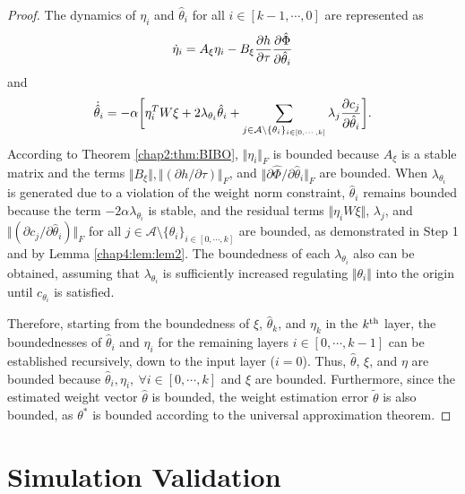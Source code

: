\begin{proof}
The dynamics of $\eta_i$ and $\hat\theta_i$ for all $i\in [k-1,\cdots,0]$ are represented as
\begin{equation}
    \dot\eta_i = 
    A_\xi\eta_i -B_\xi {\partial h\over\partial\tau}
    {\partial \hat\Phi\over \partial \hat\theta_i}
\end{equation}
and
\begin{equation}
    \dot{\hat\theta}_i 
    =
    -\alpha 
    \bigg[
        \eta_i^TW\xi+2\lambda_{\theta_i} \hat\theta_i
        +
        \sum_{j\in\mathcal{A}\setminus \{\theta_i\}_{i\in[0,\cdots,k]}}\lambda_j{\partial c_j\over\partial \hat\theta_i}
    \bigg]
    .
\end{equation}
According to Theorem \ref{chap2:thm:BIBO}, $\Vert\eta_i\Vert_F$ is bounded because $A_\xi$ is a stable matrix and the terms $\Vert B_\xi\Vert, \Vert(\partial h/\partial \tau)\Vert_F$, and $\Vert\partial \hat\Phi/\partial\hat\theta_i\Vert_F$ are bounded.
When $\lambda_{\theta_i}$ is generated due to a violation of the weight norm constraint, $\hat\theta_i$ remains bounded because the term $-2\alpha\lambda_{\theta_i}$ is stable, and the residual terms $\Vert\eta_iW\xi\Vert$, $\lambda_j$, and $\Vert(\partial c_j/\partial \hat\theta_i)\Vert_F$ for all $j\in\mathcal{A}\setminus \{\theta_i\}_{i\in[0,\cdots,k]}$ are bounded, as demonstrated in Step 1 and by Lemma \ref{chap4:lem:lem2}.
The boundedness of each $\lambda_{\theta_i}$ also can be obtained, assuming that $\lambda_{\theta_i}$ is sufficiently increased regulating $\Vert\theta_i\Vert$ into the origin until $c_{\theta_i}$ is satisfied.

Therefore, starting from the boundedness of $\xi$, $\hat\theta_k$, and $\eta_k$ in the $k\textsuperscript{th}$ layer, the boundednesses of $\hat\theta_i$ and $\eta_i$ for the remaining layers $i\in[0,\cdots,k-1]$ can be established recursively, down to the input layer ($i=0$). 
Thus, $\hat\theta$, $\xi$, and $\eta$ are bounded because $\hat\theta_i,\eta_i,\ \forall i\in[0,\cdots,k]$ and $\xi$ are bounded. Furthermore, since the estimated weight vector $\hat\theta$ is bounded, the weight estimation error $\tilde\theta$ is also bounded, as $\theta^*$ is bounded according to the universal approximation theorem.

\end{proof}

\section{Simulation Validation} 

